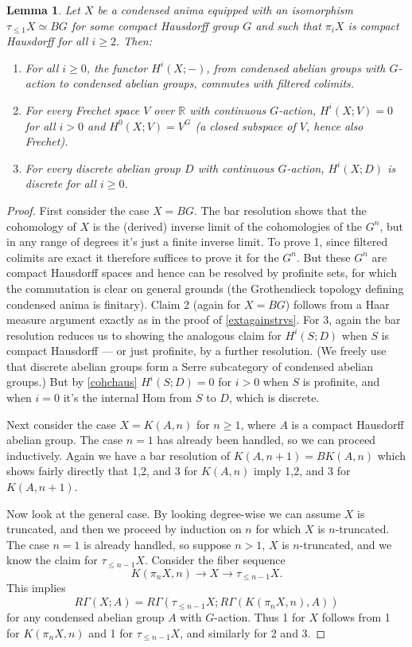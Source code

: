 \documentclass[12pt]{article}
\newtheorem{lemma}[theorem]{Lemma}
\theoremstyle{definition}
\newcommand{\mbb}{\mathbb}
\begin{document}
\begin{lemma}\label{cohchausx}
Let $X$ be a condensed anima equipped with an isomorphism $\tau_{\leq 1}X \simeq BG$ for some compact Hausdorff group $G$ and such that $\pi_iX$ is compact Hausdorff for all $i\geq 2$. Then:
\begin{enumerate}
\item For all $i\geq 0$, the functor $H^i(X;-)$, from condensed abelian groups with $G$-action to condensed abelian groups, commutes with filtered colimits.
\item For every Frechet space $V$ over $\mbb{R}$ with continuous $G$-action, $H^i(X;V)=0$ for all $i>0$ and $H^0(X;V)=V^G$ (a closed subspace of $V$, hence also Frechet).
\item For every discrete abelian group $D$ with continuous $G$-action, $H^i(X;D)$ is discrete for all $i\geq 0$.
\end{enumerate}
\end{lemma}
\begin{proof}
First consider the case $X=BG$.  The bar resolution shows that the cohomology of $X$ is the (derived) inverse limit of the cohomologies of the $G^n$, but in any range of degrees it's just a finite inverse limit.  To prove 1, since filtered colimits are exact it therefore suffices to prove it for the $G^n$.  But these   $G^n$ are compact Hausdorff spaces and hence can be resolved by profinite sets, for which the commutation is clear on general grounds (the Grothendieck topology defining condensed anima is finitary).  Claim 2 (again for $X=BG$) follows from a Haar measure argument exactly as in the proof of \ref{extagainstrvs}.  For 3, again the bar resolution reduces us to showing the analogous claim for $H^i(S;D)$ when $S$ is compact Hausdorff --- or just profinite, by a further resolution.  (We freely use that discrete abelian groups form a Serre subcategory of condensed abelian groups.) But by \ref{cohchaus} $H^i(S;D)=0$ for $i>0$ when $S$ is profinite, and when $i=0$ it's the internal Hom from $S$ to $D$, which is discrete.

Next consider the case $X=K(A,n)$ for $n\geq 1$, where $A$ is a compact Hausdorff abelian group.  The case $n=1$ has already been handled, so we can proceed inductively.  Again we have a bar resolution of $K(A,n+1)= BK(A,n)$ which shows fairly directly that 1,2, and 3 for $K(A,n)$ imply 1,2,  and 3 for $K(A,n+1)$.

Now look at the general case.  By looking degree-wise we can assume $X$ is truncated, and then we proceed by induction on $n$ for which $X$ is $n$-truncated.  The case $n=1$ is already handled, so suppose $n>1$, $X$ is $n$-truncated, and we know the claim for $\tau_{\leq n-1}X$.  Consider the fiber sequence
$$K(\pi_nX,n) \to X \to \tau_{\leq n-1}X.$$
This implies
$$R\Gamma(X;A) = R\Gamma(\tau_{\leq n-1}X;R\Gamma(K(\pi_nX,n),A))$$
for any condensed abelian group $A$ with $G$-action.  Thus 1 for $X$ follows from 1 for $K(\pi_nX,n)$ and 1 for $\tau_{\leq n-1}X$, and similarly for 2 and 3.\end{proof}
\end{document}
